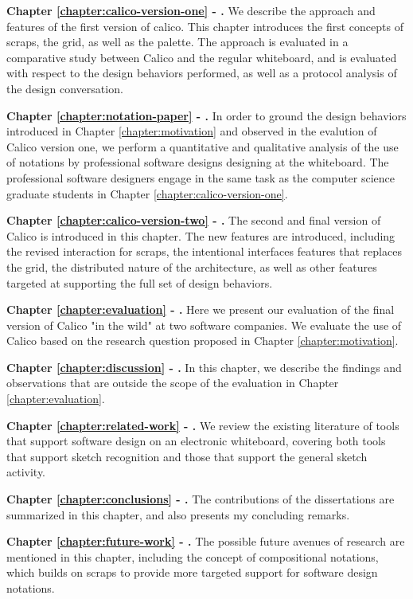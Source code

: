 \textbf{Chapter \ref{chapter:calico-version-one} - .} We describe the approach and features of the first version of calico. This chapter introduces the first concepts of scraps, the grid, as well as the palette. The approach is evaluated in a comparative study between Calico and the regular whiteboard, and is evaluated with respect to the design behaviors performed, as well as a protocol analysis of the design conversation.

\textbf{Chapter \ref{chapter:notation-paper} - .} In order to ground the design behaviors introduced in Chapter \ref{chapter:motivation} and observed in the evalution of Calico version one, we perform a quantitative and qualitative analysis of the use of notations by professional software designs designing at the whiteboard. The professional software designers engage in the same task as the computer science graduate students in Chapter \ref{chapter:calico-version-one}.

\textbf{Chapter \ref{chapter:calico-version-two} - .} The second and final version of Calico is introduced in this chapter. The new features are introduced, including the revised interaction for scraps, the intentional interfaces features that replaces the grid, the distributed nature of the architecture, as well as other features targeted at supporting the full set of design behaviors.

\textbf{Chapter \ref{chapter:evaluation} - .} Here we present our evaluation of the final version of Calico "in the wild" at two software companies. We evaluate the use of Calico based on the research question proposed in Chapter \ref{chapter:motivation}.

\textbf{Chapter \ref{chapter:discussion} - .} In this chapter, we describe the findings and observations that are outside the scope of the evaluation in Chapter \ref{chapter:evaluation}. 

\textbf{Chapter \ref{chapter:related-work} - .} We review the existing literature of tools that support software design on an electronic whiteboard, covering both tools that support sketch recognition and those that support the general sketch activity.

\textbf{Chapter \ref{chapter:conclusions} - .} The contributions of the dissertations are summarized in this chapter, and also presents my concluding remarks.

\textbf{Chapter \ref{chapter:future-work} - .} The possible future avenues of research are mentioned in this chapter, including the concept of compositional notations, which builds on scraps to provide more targeted support for software design notations.

